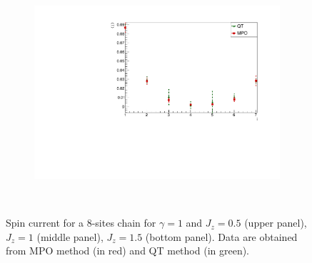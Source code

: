 \begin{figure}
\begin{subfigure}{\columnwidth}
        \includegraphics[scale=0.5]{Figures/SpinCurrComparison_8sJ10515.pdf}
        \label{fig:SpinCurrComparison_8sJ10515}
        \end{subfigure}\\
    \captionsetup{width=1.\linewidth}
    \caption{Spin current for a 8-sites chain for $\gamma = 1$ and $J_z = 0.5$ (upper panel), $J_z = 1$ (middle panel), $J_z = 1.5$ (bottom panel). Data are obtained from MPO method (in red) and QT method (in green).}
    \label{fig:my_label}
\end{figure}